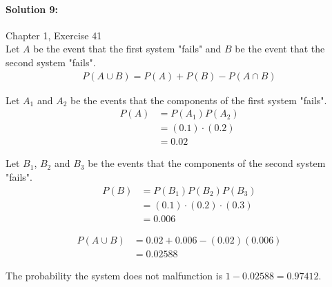 \documentclass[a4paper]{article}
\begin{document}
\paragraph{Solution 9:}
Chapter 1, Exercise 41 \\

\indent Let $A$ be the event that the first system "fails" and $B$ be the event that the second system "fails".
\begin{align*}
P(A \cup B) = P(A) + P(B) - P(A \cap B)
\end{align*}

\indent Let $A_{1}$ and $A_{2}$ be the events that the components of the first system "fails".
\begin{align*}
P(A) &= P(A_{1})P(A_{2}) \\
     &= (0.1) \cdot (0.2) \\
     &= 0.02
\end{align*}

\indent Let $B_{1}$, $B_{2}$ and $B_{3}$ be the events that the components of the second system "fails".
\begin{align*}
P(B) &= P(B_{1})P(B_{2})P(B_{3}) \\
     &= (0.1) \cdot (0.2) \cdot (0.3) \\
     &= 0.006
\end{align*}

\begin{align*}
P(A \cup B) &= 0.02 + 0.006 - (0.02)(0.006) \\
            &= 0.02588
\end{align*}

\indent The probability the system does not malfunction is $1-0.02588 = 0.97412$.
\end{document}
